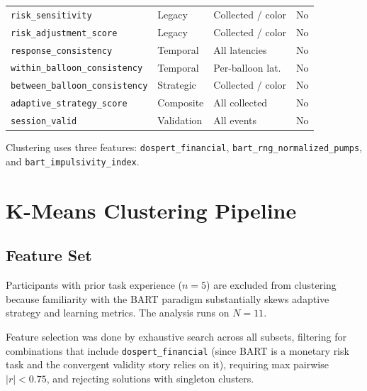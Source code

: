 \documentclass[11pt,a4paper]{article}
\begin{document}
{\begin{longtable}{@{}>{\raggedright\arraybackslash}p{4.8cm}llc@{}}
\texttt{risk\_sensitivity}                 & Legacy      & Collected / color & No \\
\texttt{risk\_adjustment\_score}           & Legacy      & Collected / color & No \\
\texttt{response\_consistency}             & Temporal    & All latencies     & No \\
\texttt{within\_balloon\_consistency}      & Temporal    & Per-balloon lat.  & No \\
\texttt{between\_balloon\_consistency}     & Strategic   & Collected / color & No \\
\texttt{adaptive\_strategy\_score}         & Composite   & All collected     & No \\
\texttt{session\_valid}                    & Validation  & All events        & No \\
\bottomrule
\end{longtable}
}%

Clustering uses three features: \texttt{dospert\_financial},
\texttt{bart\_rng\_\allowbreak{}normalized\_pumps}, and
\texttt{bart\_impulsivity\_\allowbreak{}index}.


\section{K-Means Clustering Pipeline}
\label{sec:clustering}

\subsection{Feature Set}

Participants with prior task experience ($n = 5$) are excluded from
clustering because familiarity with the BART paradigm substantially skews
adaptive strategy and learning metrics. The analysis runs on $N = 11$.

Feature selection was done by exhaustive search across all subsets,
filtering for combinations that include \texttt{dospert\_financial} (since
BART is a monetary risk task and the convergent validity story relies on
it), requiring max pairwise $|r| < 0.75$, and rejecting solutions with
singleton clusters.
\end{document}
